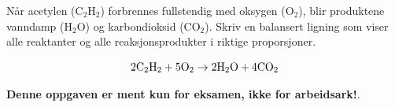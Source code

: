

Når acetylen (C$_{2}$H$_{2}$) forbrennes fullstendig med oksygen (O$_{2}$), blir produktene vanndamp (H$_{2}$O) og karbondioksid (CO$_{2}$). Skriv en balansert ligning som viser alle reaktanter og alle reaksjonsprodukter i riktige proporsjoner.







$$\hbox{2C}_2\hbox{H}_{2} + \hbox{5O}_2 \to \hbox{2H}_2\hbox{O} + \hbox{4CO}_2$$







{\bf Denne oppgaven er ment kun for eksamen, ikke for arbeidsark!}.


